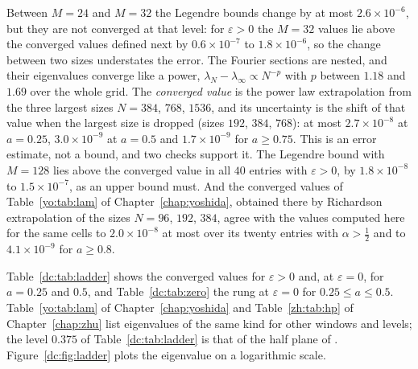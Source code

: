 Between $M=24$ and $M=32$ the Legendre bounds change by at most $2.6\times10^{-6}$, but they are not converged at that level: for $\varepsilon>0$ the $M=32$ values lie above the converged values defined next by $0.6\times10^{-7}$ to $1.8\times10^{-6}$, so the change between two sizes understates the error. The Fourier sections are nested, and their eigenvalues converge like a power, $\lambda_N-\lambda_\infty\propto N^{-p}$ with $p$ between $1.18$ and $1.69$ over the whole grid. The \emph{converged value} is the power law extrapolation from the three largest sizes $N=384$, $768$, $1536$, and its uncertainty is the shift of that value when the largest size is dropped (sizes $192$, $384$, $768$): at most $2.7\times10^{-8}$ at $a=0.25$, $3.0\times10^{-9}$ at $a=0.5$ and $1.7\times10^{-9}$ for $a\ge0.75$. This is an error estimate, not a bound, and two checks support it. The Legendre bound with $M=128$ lies above the converged value in all $40$ entries with $\varepsilon>0$, by $1.8\times10^{-8}$ to $1.5\times10^{-7}$, as an upper bound must. And the converged values of Table~\ref{yo:tab:lam} of Chapter~\ref{chap:yoshida}, obtained there by Richardson extrapolation of the sizes $N=96$, $192$, $384$, agree with the values computed here for the same cells to $2.0\times10^{-8}$ at most over its twenty entries with $\alpha>\frac12$ and to $4.1\times10^{-9}$ for $a\ge0.8$.

Table~\ref{dc:tab:ladder} shows the converged values for $\varepsilon>0$ and, at $\varepsilon=0$, for $a=0.25$ and $0.5$, and Table~\ref{dc:tab:zero} the rung at $\varepsilon=0$ for $0.25\le a\le0.5$. Table~\ref{yo:tab:lam} of Chapter~\ref{chap:yoshida} and Table~\ref{zh:tab:hp} of Chapter~\ref{chap:zhu} list eigenvalues of the same kind for other windows and levels; the level $0.375$ of Table~\ref{dc:tab:ladder} is that of the half plane of \cite{OAI26a}. Figure~\ref{dc:fig:ladder} plots the eigenvalue on a logarithmic scale.

